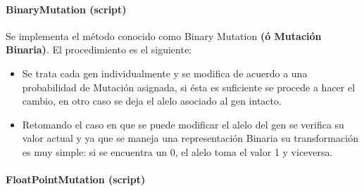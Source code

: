 \documentclass[class=report, crop=false]{standalone}
\begin{document}
\paragraph{BinaryMutation (script)}
\label{sec:a_2_4_3_1}

\begin{fulllineitems}

\begin{DUlineblock}{0em}
\item[] Se implementa el método conocido como Binary Mutation 
\textbf{(ó Mutación Binaria)}.\break
El procedimiento es el siguiente:

\begin{itemize}
\item Se trata cada gen individualmente y se modifica de acuerdo a una probabilidad de Mutación asignada, si ésta es suficiente se procede a hacer el cambio, en otro caso se deja el alelo asociado al gen intacto.
\item Retomando el caso en que se puede modificar el alelo del gen se verifica su valor actual y ya que se maneja una representación Binaria su transformación es muy simple: si se encuentra un 0, el alelo toma el valor 1 y viceversa.
\end{itemize}

\end{DUlineblock}

\end{fulllineitems}

\paragraph{FloatPointMutation (script)}
\label{sec:a_2_4_3_2}
\end{document}
